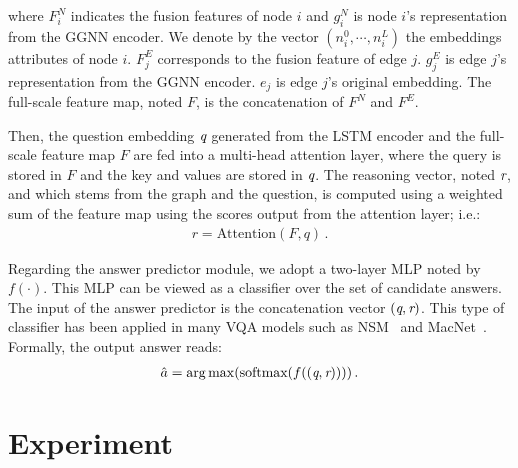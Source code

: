 \documentclass[letterpaper]{article} %
\begin{document}
where $F_i^N$ indicates the fusion features of node $i$ and $g_i^N$ is node $i$'s representation from the GGNN encoder. 
We denote by the vector $(n_i^0, \cdots,n_i^L)$ the embeddings attributes of node $i$. 
$F_j^E$ corresponds to the fusion feature of edge $j$. $g_j^E$ is edge $j$'s representation from the GGNN encoder. 
$e_j$ is edge $j$'s original embedding. 
The full-scale feature map, noted $F$, is the concatenation of $F^N$ and $F^E$.

Then, the question embedding $\emph{q}$ generated from the LSTM encoder and the full-scale feature map $F$ are fed into a multi-head attention layer, where the query is stored in $F$ and the key and values are stored in $\emph{q}$.
The reasoning vector, noted $\emph{r}$, and which stems from the graph and the question, is computed using a weighted sum of the feature map using the scores output from the attention layer; i.e.:
\begin{gather}
    r = \text{Attention}(F, q) \, .
\end{gather}

Regarding the answer predictor module, we adopt a two-layer MLP noted by $f(\cdot)$. 
This MLP can be viewed as a classifier over the set of candidate answers. 
The input of the answer predictor is the concatenation vector $(\emph{q},\emph{r})$. 
This type of classifier has been applied in many VQA models such as NSM~\cite{DBLP:conf/nips/HudsonM19} and MacNet~\cite{DBLP:conf/nips/LuYBP16}.
Formally, the output answer reads:
\begin{gather}
    \hat{a} = \mathop{\arg\max}(\text{softmax}(f((\emph{q},\emph{r}))))\, .
\end{gather}



\section{Experiment}\label{sec:experiments}
\end{document}

